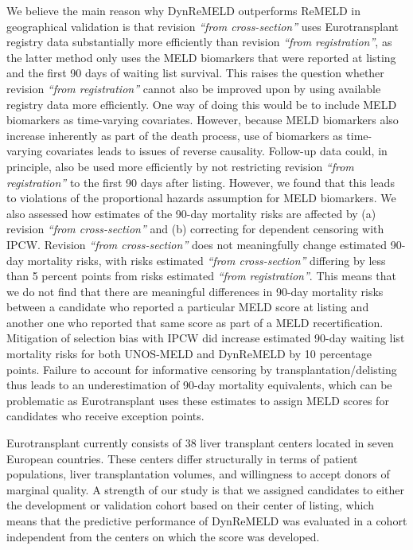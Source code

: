 \documentclass[11pt,twoside,]{book}
\begin{document}
We believe the main reason why DynReMELD outperforms ReMELD in
geographical validation is that revision \emph{``from cross-section''} uses Eurotransplant
registry data substantially more efficiently than revision \emph{``from
registration''}, as the latter method only uses the MELD biomarkers that were reported
at listing and the first 90 days of waiting list survival. This raises the
question whether revision \emph{``from registration''} cannot also be improved
upon by using available registry data more efficiently. One way of doing
this would be to include MELD biomarkers as time-varying covariates. However,
because MELD biomarkers also increase inherently as part of the death process,
use of biomarkers as time-varying covariates leads to issues of reverse causality. Follow-up data could,
in principle, also be used more efficiently by not restricting revision \emph{``from
registration''} to the first 90 days after listing. However, we found
that this leads to violations of the proportional hazards assumption for
MELD biomarkers.
\newpage
We also assessed how estimates of the 90-day mortality risks are affected
by (a) revision \emph{``from cross-section''} and (b) correcting for dependent
censoring with IPCW. Revision \emph{``from cross-section''} does not
meaningfully change estimated 90-day mortality risks, with risks
estimated \emph{``from cross-section''} differing by less than 5 percent points
from risks estimated \emph{``from registration''}. This means that we do not
find that there are meaningful differences in 90-day mortality risks between
a candidate who reported a particular MELD score at listing and another
one who reported that same score as part of a MELD
recertification. Mitigation of selection bias with IPCW did increase
estimated 90-day waiting list mortality risks for both UNOS-MELD and
DynReMELD by 10 percentage points. Failure to account for informative censoring by transplantation/delisting thus leads to an underestimation of
90-day mortality equivalents, which can be problematic as Eurotransplant uses
these estimates to assign MELD scores for candidates who receive exception points.

Eurotransplant currently consists of 38 liver transplant centers
located in seven European countries. These centers differ structurally in
terms of patient populations, liver transplantation volumes, and willingness to accept
donors of marginal quality. A strength of our study is that we assigned
candidates to either the development or validation cohort based on their
center of listing, which means that the predictive performance of
DynReMELD was evaluated in a cohort independent from the centers on
which the score was developed.
\end{document}
